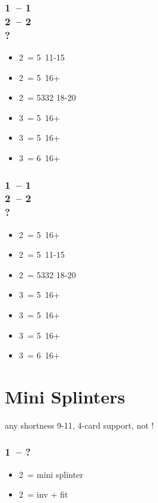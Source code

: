 \subsubsection*{1\hearts\ -- 1\ntx\ \\ 2\clubs\ -- 2\diams \\ ?}
\begin{itemize}
    \item 2\hearts\ = 5\clubs\ 11-15
    \item 2\spades\ = 5\spades\ 16+
    \item 2\ntx\ = 5332 18-20
    \item 3\clubs\ = 5\clubs\ 16+
    \item 3\diams\ = 5\diams\ 16+
    \item 3\hearts\ = 6\hearts\ 16+
\end{itemize}

\subsubsection*{1\spades\ -- 1\ntx\ \\ 2\clubs\ -- 2\diams \\ ?}
\begin{itemize}
    \item 2\hearts\ = 5\hearts\ 16+
    \item 2\spades\ = 5\clubs\ 11-15
    \item 2\ntx\ = 5332 18-20
    \item 3\clubs\ = 5\clubs\ 16+
    \item 3\diams\ = 5\diams\ 16+
    \item 3\hearts\ = 5\hearts\ 16+
    \item 3\spades\ = 6\spades\ 16+
\end{itemize}

\section{\texorpdfstring{Mini Splinters}{miniSplinter}}\label{sec:miniSplinter}

any shortness 9-11, 4-card support, not \gf!

\subsubsection*{1\hearts\ -- ?}
\begin{itemize}
    \item 2\spades\ = mini splinter
    \item 2\nt\ = inv + fit
\end{itemize}

